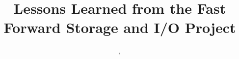 \documentclass[conference]{IEEEtran} \pdfpagewidth=8.5in
\begin{document}
\title{Lessons Learned from the Fast Forward Storage and I/O Project}

\author{
,\IEEEauthorblockA{}
}
\maketitle
\end{document}
